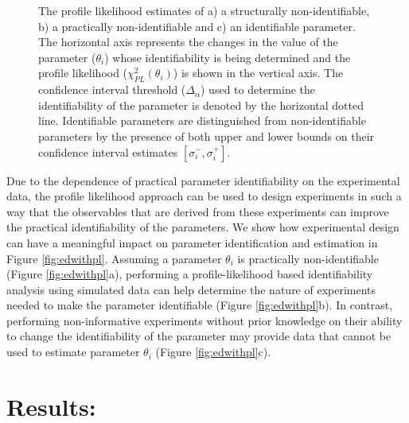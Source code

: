 \documentclass[10pt]{article}
\begin{document}
	\begin{figure}[!tbhp]
		\caption{The profile likelihood estimates of a) a structurally non-identifiable, b) a practically non-identifiable and c) an identifiable parameter. The horizontal axis represents the changes in the value of the parameter ($\theta_i$) whose identifiability is being determined and the profile likelihood ($\chi^2_{PL}(\theta_i)$) is shown in the vertical axis. The confidence interval threshold ($\Delta_{\alpha}$) used to determine the identifiability of the parameter is denoted by the horizontal dotted line. Identifiable parameters are distinguished from non-identifiable parameters by the presence of both upper and lower bounds on their confidence interval estimates $\left[\sigma_{i}^-,\sigma_{i}^+\right]$. }\label{fig:identtypes}
	\end{figure}	
	
	Due to the dependence of practical parameter identifiability on the experimental data, the profile likelihood approach can be used to design experiments in such a way that the observables that are derived from these experiments can improve the practical identifiability of the parameters. We show how experimental design can have a meaningful impact on parameter identification and estimation in Figure \ref{fig:edwithpl}.	Assuming a parameter $\theta_i$ is practically non-identifiable (Figure \ref{fig:edwithpl}a), performing a profile-likelihood based identifiability analysis using simulated data can help determine the nature of experiments needed to make the parameter identifiable (Figure \ref{fig:edwithpl}b). In contrast, performing non-informative experiments without prior knowledge on their ability to change the identifiability of the parameter may provide data that cannot be used to estimate parameter $\theta_i$ (Figure \ref{fig:edwithpl}c).	
	
	
	\section{Results:}
\end{document}

